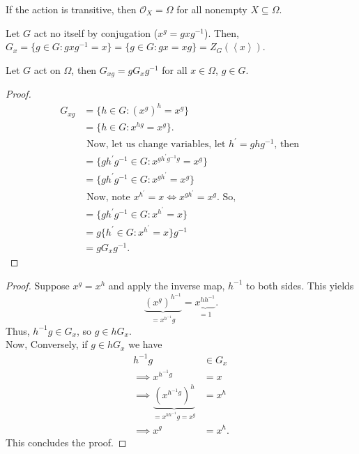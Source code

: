 \begin{remark}
	If the action is transitive, then \(\mathscr{O}_{X} = \Omega\) for all nonempty \(X\subseteq \Omega\).
\end{remark}
\begin{example}
	Let \(G\) act no itself by conjugation (\(x^{g} = gxg^{-1}\)). Then, \(G_{x}= \{g \in G : gxg^{-1} = x\} = \{g \in G: gx = xg\} = Z_{G}\left( \left<x \right>  \right)   \).
\end{example}
\begin{theorem}
	Let \(G\) act on \(\Omega\), then \(G_{xg} = gG_{x}g^{-1}\) for all \(x \in \Omega\), \(g \in G\).
\end{theorem}
\begin{proof}
	\begin{align*}
		G_{xg} &= \{h \in G : \left( x^{g} \right)^{h} = x^{g} \} \\
		&= \{h \in G : x^{hg} = x^{g}\}. \\
		&\text{	Now, let us change variables, let \(h^{\prime} = ghg^{-1}\), then }\\
		&= \{gh^{\prime}g^{-1} \in G : x^{gh^{\prime}g^{-1}g} = x^{g}\} \\
		&= \{gh^{\prime}g^{-1} \in G : x^{gh^{\prime}}= x^{ g}\} \\
		&\text{	Now, note \(x^{h^{\prime}} = x \iff x^{gh^{\prime}} = x^{g}\). So, }\\
		&= \{gh^{\prime}g^{-1} \in G : x^{h^{\prime}} = x\} \\
		&= g \{h^{\prime} \in G : x^{h^{\prime}} = x\} g^{-1}\\
		&= gG_{x}g^{-1}
	.\end{align*}
\end{proof}
\begin{proof}
	Suppose \(x^{g}= x^{h}\) and apply the inverse map, \(h^{-1}\) to both sides. This yields \[
		\underbrace{\left( x^{g} \right)^{h^{-1}}}_{= x^{h^{-1}}g} = \underbrace{x^{h h^{-1}} }_{=1}
	.\]
	Thus, \(h^{-1} g \in G_{x}\), so \(g \in h G_{x}\).\\
	Now, Conversely, if \(g \in hG_{x}\) we have
	\begin{align*}
		h^{-1}g &\in G_{x}\\
		\implies x^{h^{-1}g} &= x\\
		\implies \underbrace{\left( x^{h^{-1} g} \right)^{h}}_{= x^{h h^{-1}}g = x^{g}} &= x^{h}\\
		\implies x^{g} &= x^{h}
	.\end{align*}
	This concludes the proof.
\end{proof}
